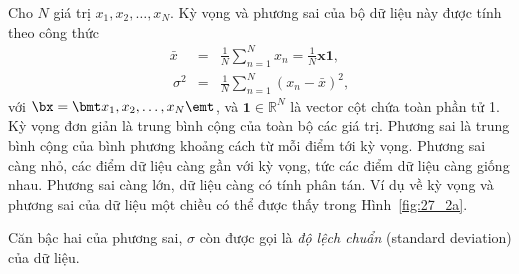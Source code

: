 Cho $N$ giá trị $x_1, x_2, \dots, x_N$. {Kỳ vọng} và {phương sai}
của bộ dữ liệu này được tính theo công thức
\begin{eqnarray} 
    \bar{x} &=& \frac{1}{N}\sum_{n=1}^N x_n = \frac{1}{N}\mathbf{x1},\\\ 
    \sigma^2 &=& \frac{1}{N} \sum_{n=1}^N (x_n - \bar{x})^2,
\end{eqnarray} 
với $\bx = \bmt x_1, x_2, \dots, x_N\emt $, và $\mathbf{1} \in \mathbb{R}^N$ là
vector cột chứa toàn phần tử 1. Kỳ vọng đơn giản là trung bình cộng của toàn bộ
các giá trị. Phương sai là trung bình cộng của bình phương khoảng cách từ mỗi
điểm tới kỳ vọng. Phương sai càng nhỏ, các điểm dữ liệu càng gần với kỳ vọng,
tức các điểm dữ liệu càng giống nhau. Phương sai càng lớn, dữ liệu càng có tính
phân tán. Ví dụ về kỳ vọng và phương sai của dữ liệu một chiều có thể được thấy
trong Hình~\ref{fig:27_2a}. 

Căn bậc hai của phương sai, $\sigma$ còn được gọi là \textit{độ lệch chuẩn} (standard deviation) của
dữ liệu.
 
